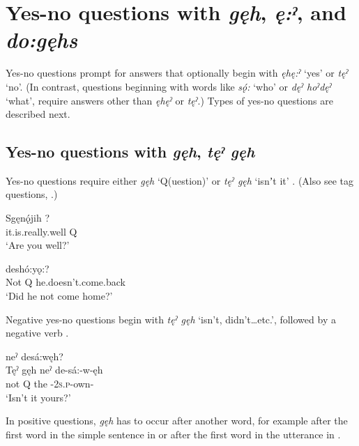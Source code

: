\z



\section{Yes-no questions with \textit{gęh}, \textit{ę:ˀ}, and \textit{do:gęhs}} \label{Yes-no questions with [gęh], [ę:ˀ], and [do:gęhs]}
Yes-no questions prompt for answers that optionally begin with \textit{ęhę:ˀ} ‘yes’ or \textit{tęˀ} ‘no’. (In contrast, questions beginning with words like \textit{sǫ́:} ‘who’ or \textit{dęˀ hoˀdęˀ} ‘what’, require answers other than \textit{ęhęˀ} or \textit{tęˀ}.) Types of yes-no questions are described next.



\subsection{Yes-no questions with \textit{gęh}, \textit{tęˀ gęh}} \label{Yes-no questions with [gęh]}

Yes-no questions require either \textit{gęh} ‘Q(uestion)’  or \textit{tęˀ gęh} ‘isnʼt it’ . (Also see tag questions, .)

\ea\label{ex:tagquesex} 
\gll Sgęnǫ́jih ? \\
it.is.really.well Q\\
\glt ‘Are you well?’
\z

\ea\label{ex:tagquesex2} 
\gll {}  deshó:yǫ:? \\
Not Q he.doesn’t.come.back\\
\glt ‘Did he not come home?’
\z

Negative yes-no questions begin with \textit{tęˀ gęh} ‘isn't, didn't…etc.’, followed by a negative verb .

\ea\label{ex:tagquesex5} 
  neˀ desá:węh?\\
\gll Tęˀ gęh neˀ de-sá:-w-ęh \\
not Q the {\negative}-\textsc{2s.p}-own-{\stative}\\
\glt ‘Isn’t it yours?’
\z

In positive questions, \textit{gęh} has to occur after another word, for example after the first word in the simple sentence in  or after the first word in the utterance in . 

